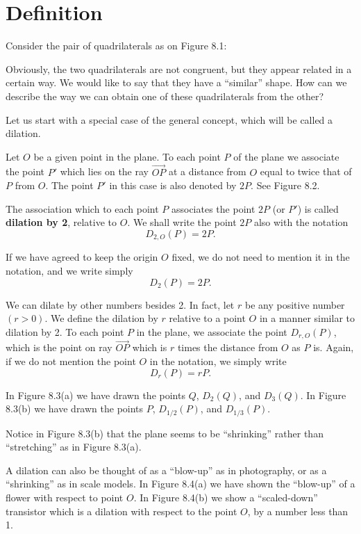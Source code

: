\documentclass[12pt]{book} %
\begin{document}
\section{Definition}

Consider the pair of quadrilaterals as on Figure 8.1:


Obviously, the two quadrilaterals are not congruent, but they appear related in a certain way. We would like to say that they have a ``similar'' shape. How can we describe the way we can obtain one of these quadrilaterals from the other?

Let us start with a special case of the general concept, which will be called a dilation.

Let $O$ be a given point in the plane. To each point $P$ of the plane we associate the point $P'$ which lies on the ray $\overrightarrow{OP}$ at a distance from $O$ equal to twice that of $P$ from $O$. The point $P'$ in this case is also denoted by $2P$. See Figure 8.2.


The association which to each point $P$ associates the point $2P$ (or $P'$) is called \textbf{dilation by 2}, relative to $O$. We shall write the point $2P$ also with the notation
\[
D_{2,O}(P)=2P.
\]

If we have agreed to keep the origin $O$ fixed, we do not need to mention it in the notation, and we write simply
\[
D_2(P)=2P.
\]

We can dilate by other numbers besides 2. In fact, let $r$ be any positive number $(r>0)$. We define the dilation by $r$ relative to a point $O$ in a manner similar to dilation by 2. To each point $P$ in the plane, we associate the point $D_{r,O}(P)$, which is the point on ray $\overrightarrow{OP}$ which is $r$ times the distance from $O$ as $P$ is. Again, if we do not mention the point $O$ in the notation, we simply write
\[
D_r(P)=rP.
\]

In Figure 8.3(a) we have drawn the points $Q$, $D_2(Q)$, and $D_3(Q)$.
In Figure 8.3(b) we have drawn the points $P$, $D_{1/2}(P)$, and $D_{1/3}(P)$.


Notice in Figure 8.3(b) that the plane seems to be ``shrinking'' rather than ``stretching'' as in Figure 8.3(a).

A dilation can also be thought of as a ``blow-up'' as in photography, or as a ``shrinking'' as in scale models. In Figure 8.4(a) we have shown the ``blow-up'' of a flower with respect to point $O$. In Figure 8.4(b) we show a ``scaled-down'' transistor which is a dilation with respect to the point $O$, by a number less than 1.
\end{document}
